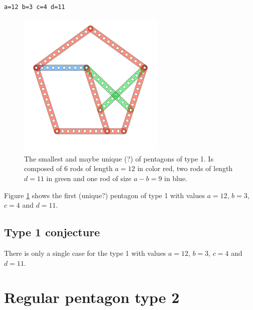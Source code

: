 \documentclass[11pt]{article}
\begin{document}
\begin{lstlisting}
a=12 b=3 c=4 d=11
\end{lstlisting}

\begin{figure}
\centering
\includegraphics[width=7cm]{figs/pentagon-12a}
\caption{The smallest and maybe unique (?) of pentagons of type 1.
Is composed of 6 rods of length $a = 12$ in color red,
two rods of length $d=11$ in green and one rod of size $a-b = 9$ in blue.}
\label{pentagon-12a}
\end{figure}

Figure \ref{pentagon-12a} shows the first (unique?) pentagon of type 1 with values
$a=12$, $b=3$, $c=4$ and $d=11$.

\subsection{Type 1 conjecture}
There is only a single case for the type 1 with values $a=12$, $b=3$, $c=4$ and $d=11$.

\vspace{100em}

\section{Regular pentagon type 2}
\end{document}
